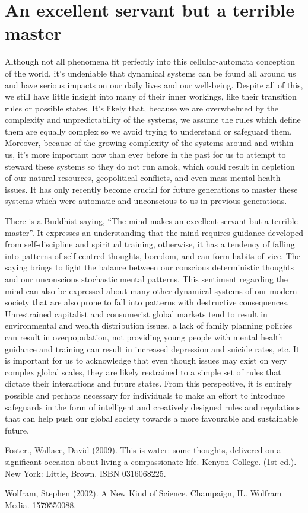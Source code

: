 \documentclass{article}
\begin{document}
\section{An excellent servant but a terrible master}

Although not all phenomena fit perfectly into this cellular-automata conception of the world, it's undeniable that dynamical systems can be found all around us and have serious impacts on our daily lives and our well-being. Despite all of this, we still have little insight into many of their inner workings, like their transition rules or possible states. It's likely that, because we are overwhelmed by the complexity and unpredictability of the systems, we assume the rules which define them are equally complex so we avoid trying to understand or safeguard them. Moreover, because of the growing complexity of the systems around and within us, it's more important now than ever before in the past for us to attempt to steward these systems so they do not run amok, which could result in depletion of our natural resources, geopolitical conflicts, and even mass mental health issues. It has only recently become crucial for future generations to master these systems which were automatic and unconscious to us in previous generations.

There is a Buddhist saying, ``The mind makes an excellent servant but a terrible master''. It expresses an understanding that the mind requires guidance developed from self-discipline and spiritual training, otherwise, it has a tendency of falling into patterns of self-centred thoughts, boredom, and can form habits of vice. The saying brings to light the balance between our conscious deterministic thoughts and our unconscious stochastic mental patterns. This sentiment regarding the mind can also be expressed about many other dynamical systems of our modern society that are also prone to fall into patterns with destructive consequences. Unrestrained capitalist and consumerist global markets tend to result in environmental and wealth distribution issues, a lack of family planning policies can result in overpopulation, not providing young people with mental health guidance and training can result in increased depression and suicide rates, etc. It is important for us to acknowledge that even though issues may exist on very complex global scales, they are likely restrained to a simple set of rules that dictate their interactions and future states. From this perspective, it is entirely possible and perhaps necessary for individuals to make an effort to introduce safeguards in the form of intelligent and creatively designed rules and regulations that can help push our global society towards a more favourable and sustainable future. 


\begin{thebibliography}{2}
Foster., Wallace, David (2009). This is water: some thoughts, delivered on a significant occasion about living a compassionate life. Kenyon College. (1st ed.). New York: Little, Brown. ISBN 0316068225.

Wolfram, Stephen (2002). A New Kind of Science. Champaign, IL. Wolfram Media. 1579550088.

\end{thebibliography}
\end{document}
